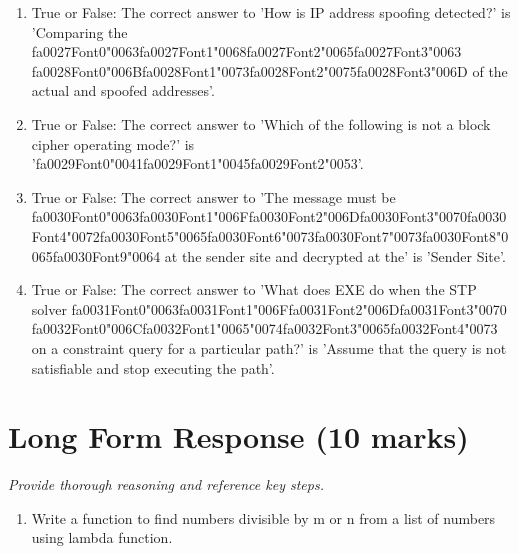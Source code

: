 \documentclass[12pt]{article}
\begin{document}
\begin{enumerate}[label=\arabic*.]
\item True or False: The correct answer to 'How is IP address spoofing detected?' is 'Comparing the {\csname fa0027Font0\endcsname\char"0063}{\csname fa0027Font1\endcsname\char"0068}{\csname fa0027Font2\endcsname\char"0065}{\csname fa0027Font3\endcsname\char"0063} {\csname fa0028Font0\endcsname\char"006B}{\csname fa0028Font1\endcsname\char"0073}{\csname fa0028Font2\endcsname\char"0075}{\csname fa0028Font3\endcsname\char"006D} of the actual and spoofed addresses'.
\item True or False: The correct answer to 'Which of the following is not a block cipher operating mode?' is '{\csname fa0029Font0\endcsname\char"0041}{\csname fa0029Font1\endcsname\char"0045}{\csname fa0029Font2\endcsname\char"0053}'.
\item True or False: The correct answer to 'The message must be {\csname fa0030Font0\endcsname\char"0063}{\csname fa0030Font1\endcsname\char"006F}{\csname fa0030Font2\endcsname\char"006D}{\csname fa0030Font3\endcsname\char"0070}{\csname fa0030Font4\endcsname\char"0072}{\csname fa0030Font5\endcsname\char"0065}{\csname fa0030Font6\endcsname\char"0073}{\csname fa0030Font7\endcsname\char"0073}{\csname fa0030Font8\endcsname\char"0065}{\csname fa0030Font9\endcsname\char"0064} at the sender site and decrypted at the' is 'Sender Site'.
\item True or False: The correct answer to 'What does EXE do when the STP solver {\csname fa0031Font0\endcsname\char"0063}{\csname fa0031Font1\endcsname\char"006F}{\csname fa0031Font2\endcsname\char"006D}{\csname fa0031Font3\endcsname\char"0070} {\csname fa0032Font0\endcsname\char"006C}{\csname fa0032Font1\endcsname\char"0065}{\char"0074}{\csname fa0032Font3\endcsname\char"0065}{\csname fa0032Font4\endcsname\char"0073} on a constraint query for a particular path?' is 'Assume that the query is not satisfiable and stop executing the path'.
\end{enumerate}

\section*{Long Form Response (10 marks)}
\textit{Provide thorough reasoning and reference key steps.}
\begin{enumerate}[label=\arabic*.]
\item Write a function to find numbers divisible by m or n from a list of numbers using lambda
function.
\end{enumerate}
\end{document}
